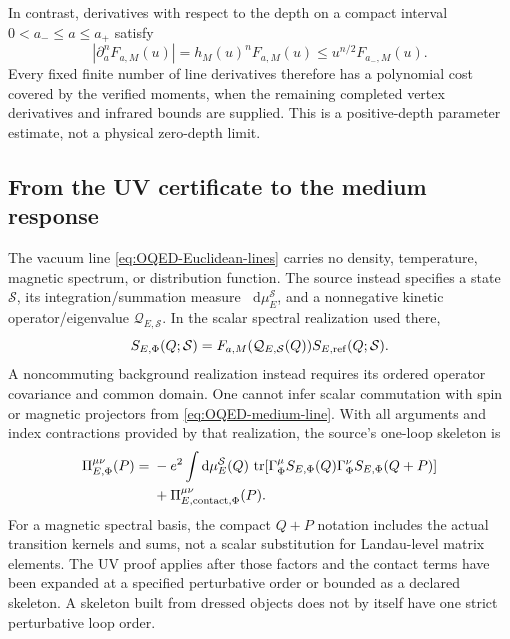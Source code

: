 \documentclass[final,5p,times,twocolumn,numbers,nopreprintline]{elsarticle}
\numberwithin{equation}{section}
\theoremstyle{definition}
\theoremstyle{remark}
\newcommand{\dd}{\mathop{}\!\mathrm d}
\newcommand{\Tr}{\operatorname{tr}}
\begin{document}
In contrast, derivatives with respect to the depth on a compact interval
\(0<a_-\leq a\leq a_+\) satisfy
\[
 |\partial_a^nF_{a,M}(u)|=h_M(u)^nF_{a,M}(u)
              \leq u^{n/2}F_{a_-,M}(u).
\]
Every fixed finite number of line derivatives therefore has a polynomial
cost covered by the verified moments, when the remaining completed
vertex derivatives and infrared bounds are supplied. This is a
positive-depth parameter estimate, not a physical zero-depth limit.

\subsection{From the UV certificate to the medium response}
\label{sec:OQED-medium}

The vacuum line \eqref{eq:OQED-Euclidean-lines} carries no density,
temperature, magnetic spectrum, or distribution function. The source
instead specifies a state \(\mathcal S\), its integration/summation
measure \(\dd\mu_E^{\mathcal S}\), and a nonnegative kinetic
operator/eigenvalue \(\mathcal Q_{E,\mathcal S}\). In the scalar
spectral realization used there,
\begin{equation}
 S_{E,\Phi}(Q;\mathcal S)
   =F_{a,M}(\mathcal Q_{E,\mathcal S}(Q))
                     S_{E,\rm ref}(Q;\mathcal S).
\label{eq:OQED-medium-line}
\end{equation}
A noncommuting background realization instead requires its ordered
operator covariance and common domain. One cannot infer scalar
commutation with spin or magnetic projectors from
\eqref{eq:OQED-medium-line}.
With all arguments and index contractions provided by that realization,
the source's one-loop skeleton is
\begin{equation}
\begin{aligned}
 \Pi_{E,\Phi}^{\mu\nu}(P)
  ={}&-e^2\int\dd\mu_E^{\mathcal S}(Q)\,
    \Tr[\Gamma_\Phi^\mu S_{E,\Phi}(Q)
              \Gamma_\Phi^\nu S_{E,\Phi}(Q+P)]\\
   &+\Pi_{E,\rm contact,\Phi}^{\mu\nu}(P).
\end{aligned}
\label{eq:OQED-completed-skeleton}
\end{equation}
For a magnetic spectral basis, the compact \(Q+P\) notation includes
the actual transition kernels and sums, not a scalar substitution for
Landau-level matrix elements. The UV proof applies after those factors
and the contact terms have been expanded at a specified perturbative
order or bounded as a declared skeleton. A skeleton built from dressed
objects does not by itself have one strict perturbative loop order.
\end{document}
